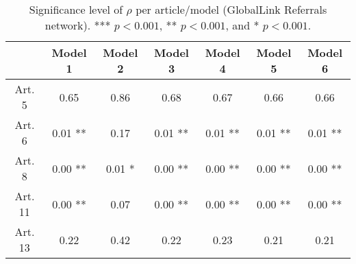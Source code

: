 \begin{table}[ht]
\centering
\begin{tabular}{ccccccc}
  \toprule
 & Model 1 & Model 2 & Model 3 & Model 4 & Model 5 & Model 6 \\ 
  \midrule
Art. 5 & 0.65   & 0.86   & 0.68   & 0.67   & 0.66   & 0.66   \\ 
   \midrule
Art. 6 & 0.01 ** & 0.17   & 0.01 ** & 0.01 ** & 0.01 ** & 0.01 ** \\ 
   \midrule
Art. 8 & 0.00 ** & 0.01 * & 0.00 ** & 0.00 ** & 0.00 ** & 0.00 ** \\ 
   \midrule
Art. 11 & 0.00 ** & 0.07   & 0.00 ** & 0.00 ** & 0.00 ** & 0.00 ** \\ 
   \midrule
Art. 13 & 0.22   & 0.42   & 0.22   & 0.23   & 0.21   & 0.21   \\ 
   \bottomrule
\end{tabular}
\caption{Significance level of $\rho$ per article/model (GlobalLink Referrals network). *** $p < 0.001$, ** $p < 0.001$, and * $p < 0.001$.} 
\end{table}
